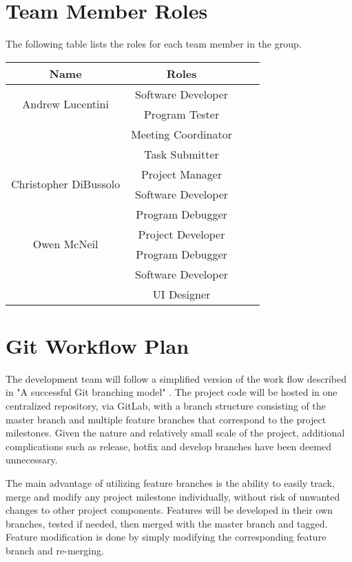 \documentclass{article}
\begin{document}
\section{Team Member Roles}
The following table lists the roles for each team member in the group.

\begin{center}
\begin{tabular}{ |c|c|c|c| } 
\hline
Name & Roles \\
\hline
\multirow{2}{6em}{Andrew Lucentini} & Software Developer\\
& Program Tester\\
& Meeting Coordinator\\
& Task Submitter\\
\hline
\multirow{2}{6em}{Christopher DiBussolo} & Project Manager \\ 
& Software Developer\\
& Program Debugger\\
\hline
\multirow{2}{6em}{Owen McNeil} & Project Developer \\ 
& Program Debugger\\
& Software Developer\\
& UI Designer\\
\hline
\end{tabular}
\end{center}

\medskip

\section{Git Workflow Plan}

The development team will follow a simplified version of the work flow described in "A successful Git branching model" \cite{git-workflow}. The project code will be hosted in one centralized repository, via GitLab, with a branch structure consisting of the master branch and multiple feature branches that correspond to the project milestones. Given the nature and relatively small scale of the project, additional complications such as release, hotfix and develop branches have been deemed unnecessary. 

The main advantage of utilizing feature branches is the ability to easily track, merge and modify any project milestone individually, without risk of unwanted changes to other project components. Features will be developed in their own branches, tested if needed, then merged with the master branch and tagged. Feature modification is done by simply modifying the corresponding feature branch and re-merging. 
\end{document}
